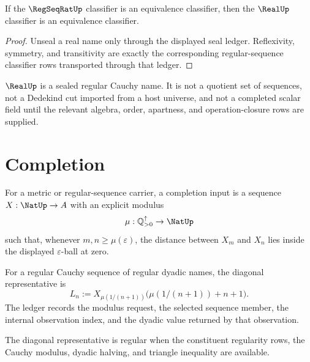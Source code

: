 \begin{theorem}
\label{thm:countable-completion-real-classifier-transfer}
If the $\RegSeqRatUp$ classifier is an equivalence classifier, then the
$\RealUp$ classifier is an equivalence classifier.
\end{theorem}

\begin{proof}
Unseal a real name only through the displayed seal ledger.  Reflexivity,
symmetry, and transitivity are exactly the corresponding regular-sequence
classifier rows transported through that ledger.
\end{proof}

\begin{principle}
\label{prin:countable-completion-real-boundary}
$\RealUp$ is a sealed regular Cauchy name.  It is not a quotient set of
sequences, not a Dedekind cut imported from a host universe, and not a
completed scalar field until the relevant algebra, order, apartness, and
operation-closure rows are supplied.
\end{principle}

\section{Completion}
\label{sec:countable-completion-completion}

\begin{definition}
\label{def:countable-completion-cauchy-modulus}
For a metric or regular-sequence carrier, a completion input is a sequence
$X:\NatUp\to A$ with an explicit modulus
$$
\mu:\mathbb Q_{>0}^{\uparrow}\to\NatUp
$$
such that, whenever $m,n\ge\mu(\varepsilon)$, the distance between
$X_m$ and $X_n$ lies inside the displayed $\varepsilon$-ball at zero.
\end{definition}

\begin{definition}
\label{def:countable-completion-diagonal-representative}
For a regular Cauchy sequence of regular dyadic names, the diagonal
representative is
$$
L_n
:=
X_{\mu(1/(n+1))}
\bigl(\mu(1/(n+1))+n+1\bigr).
$$
The ledger records the modulus request, the selected sequence member, the
internal observation index, and the dyadic value returned by that observation.
\end{definition}

\begin{theorem}
\label{thm:countable-completion-diagonal-regularity}
The diagonal representative is regular when the constituent regularity rows,
the Cauchy modulus, dyadic halving, and triangle inequality are available.
\end{theorem}

